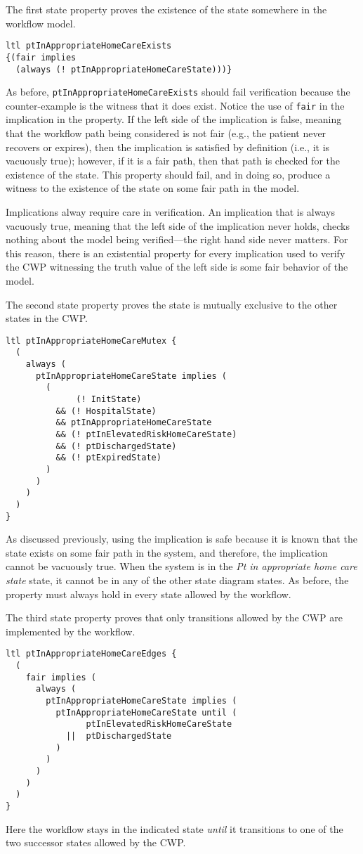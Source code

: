 The first state property proves the existence of the state somewhere in the workflow model.
%
{\small
\begin{lstlisting}[style=myPromela]
ltl ptInAppropriateHomeCareExists 
{(fair implies 
  (always (! ptInAppropriateHomeCareState)))}
\end{lstlisting}
}
%
\noindent As before, \texttt{ptInAppropriateHomeCareExists} should fail verification because the counter-example is the witness that it does exist. Notice the use of \texttt{fair} in the implication in the property. If the left side of the implication is false, meaning that the workflow path being considered is not fair (e.g., the patient never recovers or expires), then the implication is satisfied by definition (i.e., it is vacuously true); however, if it is a fair path, then that path is checked for the existence of the state. This property should fail, and in doing so, produce a witness to the existence of the state on some fair path in the model.

Implications alway require care in verification. An implication that is always vacuously true, meaning that the left side of the implication never holds, checks nothing about the model being verified---the right hand side never matters. For this reason, there is an existential property for every implication used to verify the CWP witnessing the truth value of the left side is some fair behavior of the model.

The second state property proves the state is mutually exclusive to the other states in the CWP.
%
{\small
\begin{lstlisting}[style=myPromela]
ltl ptInAppropriateHomeCareMutex {
  ( 
    always (
      ptInAppropriateHomeCareState implies (
        (
              (! InitState)
          && (! HospitalState)
          && ptInAppropriateHomeCareState
          && (! ptInElevatedRiskHomeCareState)
          && (! ptDischargedState)
          && (! ptExpiredState)
        )
      )
    )
  )
}
\end{lstlisting}
}
%
\noindent As discussed previously, using the implication is safe because it is known that the state exists on some fair path in the system, and therefore, the implication cannot be vacuously true. When the system is in the \emph{Pt in appropriate home care state} state, it cannot be in any of the other state diagram states. As before, the property must always hold in every state allowed by the workflow.

The third state property proves that only transitions allowed by the CWP are implemented by the workflow.
%
{\small
\begin{lstlisting}[style=myPromela]
ltl ptInAppropriateHomeCareEdges {
  (
    fair implies (
      always (
        ptInAppropriateHomeCareState implies (
          ptInAppropriateHomeCareState until (
                ptInElevatedRiskHomeCareState
            ||  ptDischargedState
          )
        )
      )
    )
  )
}
\end{lstlisting}
}
%
\noindent Here the workflow stays in the indicated state \emph{until} it transitions to one of the two successor states allowed by the CWP. 


